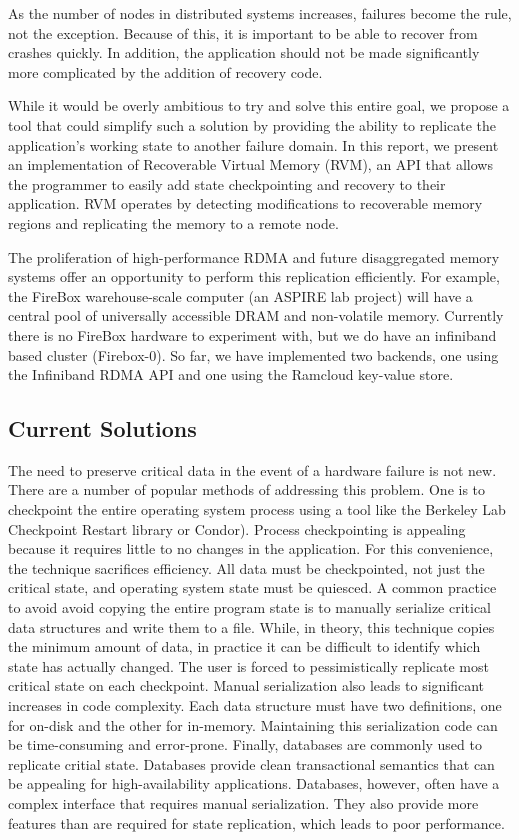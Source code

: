 As the number of nodes in distributed systems increases, failures become the
rule, not the exception. Because of this, it is important to be able to recover
from crashes quickly.  In addition, the application should not be made
significantly more complicated by the addition of recovery code.

While it would be overly ambitious to try and solve this entire goal, we propose
a tool that could simplify such a solution by providing the ability to replicate
the application's working state to another failure domain. In this report, we
present an implementation of Recoverable Virtual Memory (RVM), an API that
allows the programmer to easily add state checkpointing and recovery to their
application. RVM operates by detecting modifications to recoverable memory
regions and replicating the memory to a remote node.

The proliferation of high-performance RDMA and future disaggregated memory
systems offer an opportunity to perform this replication efficiently. For
example, the FireBox warehouse-scale computer (an ASPIRE lab project) will have
a central pool of universally accessible DRAM and non-volatile memory. Currently
there is no FireBox hardware to experiment with, but we do have an infiniband
based cluster (Firebox-0). So far, we have implemented two backends, one using
the Infiniband RDMA API and one using the Ramcloud key-value store.

\subsection{Current Solutions}
The need to preserve critical data in the event of a hardware failure is not
new. There are a number of popular methods of addressing this problem. One is to
checkpoint the entire operating system process using a tool like the Berkeley
Lab Checkpoint Restart library\cite{BLCR} or Condor\cite{Condor}). Process
checkpointing is appealing because it requires little to no changes in the
application. For this convenience, the technique sacrifices efficiency. All data
must be checkpointed, not just the critical state, and operating system state
must be quiesced. A common practice to avoid avoid copying the entire program
state is to manually serialize critical data structures and write them to a
file. While, in theory, this technique copies the minimum amount of data, in
practice it can be difficult to identify which state has actually changed. The
user is forced to pessimistically replicate most critical state on each
checkpoint. Manual serialization also leads to significant increases in code
complexity. Each data structure must have two definitions, one for on-disk and
the other for in-memory. Maintaining this serialization code can be
time-consuming and error-prone. Finally, databases are commonly used to
replicate critial state.
Databases provide clean transactional semantics that can be appealing for
high-availability applications. Databases, however, often have a complex
interface that requires manual serialization. They also provide more features
than are required for state replication, which leads to poor performance.


